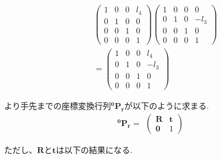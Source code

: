 \documentclass[10pt]{jarticle}
\begin{document}
	\begin{equation*}
	\begin{array}{cccc}
		&\left(
			\begin{array}{cccc}
				1 & 0 & 0 & l_4\\
				0 & 1 & 0 & 0\\
				0 & 0 & 1 & 0\\
				0 & 0 & 0 & 1
			\end{array}
		\right)
		\left(
			\begin{array}{cccc}
				1 & 0 & 0 & 0\\
				0 & 1 & 0 & -l_3\\
				0 & 0 & 1 & 0\\
				0 & 0 & 0 & 1
			\end{array}
			\right)\\
		&=
		\left(
		\begin{array}{cccc}
			1 & 0 & 0 & l_4\\
			0 & 1 & 0 & -l_3\\
			0 & 0 & 1 & 0\\
			0 & 0 & 0 & 1
		\end{array}
		\right)
	\end{array}
	\end{equation*}
	
	より手先までの座標変換行列$\boldsymbol{ ^{0}P_{r} }$が以下のように求まる.
	\begin{equation*}
	\boldsymbol{ ^{0}P_{r} } =
	\begin{array}{cc}
		\left( 
			\begin{array}{cc}
				\boldsymbol{R} & \boldsymbol{t} \\
				\boldsymbol{0} & 1 
			\end{array}
		\right)
	\end{array}
	\end{equation*}
	
	ただし、$\boldsymbol{R}$と$\boldsymbol{t}$は以下の結果になる.
\end{document}
